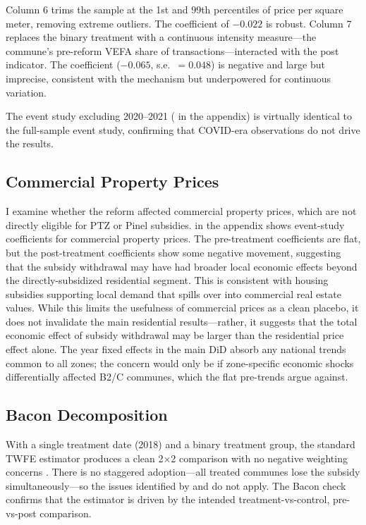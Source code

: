 \documentclass[12pt]{article}
\begin{document}
Column 6 trims the sample at the 1st and 99th percentiles of price per square meter, removing extreme outliers. The coefficient of $-0.022$ is robust. Column 7 replaces the binary treatment with a continuous intensity measure---the commune's pre-reform VEFA share of transactions---interacted with the post indicator. The coefficient ($-0.065$, s.e.\ $= 0.048$) is negative and large but imprecise, consistent with the mechanism but underpowered for continuous variation.

The event study excluding 2020--2021 ( in the appendix) is virtually identical to the full-sample event study, confirming that COVID-era observations do not drive the results.

\subsection{Commercial Property Prices}

I examine whether the reform affected commercial property prices, which are not directly eligible for PTZ or Pinel subsidies.  in the appendix shows event-study coefficients for commercial property prices. The pre-treatment coefficients are flat, but the post-treatment coefficients show some negative movement, suggesting that the subsidy withdrawal may have had broader local economic effects beyond the directly-subsidized residential segment. This is consistent with housing subsidies supporting local demand that spills over into commercial real estate values. While this limits the usefulness of commercial prices as a clean placebo, it does not invalidate the main residential results---rather, it suggests that the total economic effect of subsidy withdrawal may be larger than the residential price effect alone. The year fixed effects in the main DiD absorb any national trends common to all zones; the concern would only be if zone-specific economic shocks differentially affected B2/C communes, which the flat pre-trends argue against.

\subsection{Bacon Decomposition}

With a single treatment date (2018) and a binary treatment group, the standard TWFE estimator produces a clean 2$\times$2 comparison with no negative weighting concerns \citep{goodmanbacon2021}. There is no staggered adoption---all treated communes lose the subsidy simultaneously---so the issues identified by \citet{callaway2021} and \citet{sunak2020} do not apply. The Bacon check confirms that the estimator is driven by the intended treatment-vs-control, pre-vs-post comparison.
\end{document}
